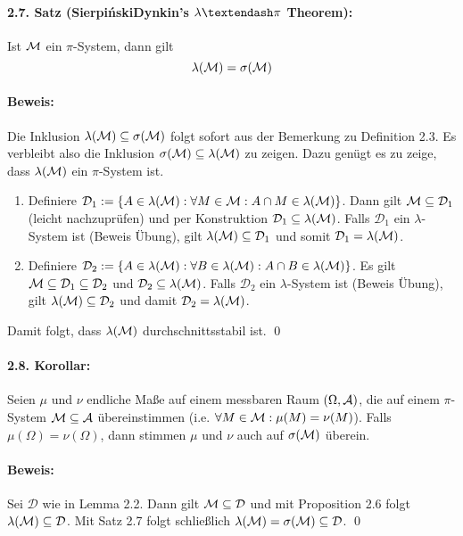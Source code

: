 \documentclass[12pt]{report}
\begin{document}
\paragraph{2.7. Satz (Sierpi\'{n}ski\textendash Dynkin's $\lambda\textendash\pi$ Theorem):}Ist $\mathcal{M}$ ein $\pi$-System, dann gilt 
$$\lambda(\mathcal{M})=\sigma(\mathcal{M})$$

\paragraph{Beweis:}Die Inklusion $\lambda(\mathcal{M})\subseteq\sigma(\mathcal{M})$ folgt sofort aus der Bemerkung zu Definition 2.3. Es verbleibt also die Inklusion $\sigma(\mathcal{M})\subseteq\lambda(\mathcal{M})$ zu zeigen. Dazu gen\"ugt es zu zeige, dass $\lambda(\mathcal{M})$ ein $\pi$-System ist. 
\begin{enumerate}[label=\Roman*.]
    \item Definiere $\mathcal{D}_1:=\left\{A\in\lambda(\mathcal{M}):\forall M\in\mathcal{M}:A\cap M\in\lambda(\mathcal{M})\right\}$. Dann gilt $\mathcal{M}\subseteq\mathcal{D}_1$ (leicht nachzupr\"ufen) und per Konstruktion $\mathcal{D}_1\subseteq\lambda(\mathcal{M})$. Falls $\mathcal{D}_1$ ein $\lambda$-System ist (Beweis \"Ubung), gilt $\lambda(\mathcal{M})\subseteq\mathcal{D}_1$ und somit $\mathcal{D}_1=\lambda(\mathcal{M})$.
    \item Definiere $\mathcal{D}_2:=\left\{A\in\lambda(\mathcal{M}):\forall B\in\lambda(\mathcal{M}):A\cap B\in\lambda(\mathcal{M})\right\}$. Es gilt $\mathcal{M}\subseteq\mathcal{D}_1\subseteq\mathcal{D}_2$ und $\mathcal{D}_2\subseteq\lambda(\mathcal{M})$. Falls $\mathcal{D}_2$ ein $\lambda$-System ist (Beweis \"Ubung), gilt $\lambda(\mathcal{M})\subseteq\mathcal{D}_2$ und damit $\mathcal{D}_2=\lambda(\mathcal{M})$. 
\end{enumerate}
Damit folgt, dass $\lambda(\mathcal{M})$ durchschnittsstabil ist. \qed

\paragraph{2.8. Korollar:}Seien $\mu$ und $\nu$ endliche Ma\ss{}e auf einem messbaren Raum $(\Omega,\mathcal{A})$, die auf einem $\pi$-System $\mathcal{M}\subseteq\mathcal{A}$ \"ubereinstimmen (i.e. $\forall M\in\mathcal{M}:\mu(M)=\nu(M)$). Falls $\mu(\Omega)=\nu(\Omega)$, dann stimmen $\mu$ und $\nu$ auch auf $\sigma(\mathcal{M})$ \"uberein. 

\paragraph{Beweis:}Sei $\mathcal{D}$ wie in Lemma 2.2. Dann gilt $\mathcal{M}\subseteq\mathcal{D}$ und mit Proposition 2.6 folgt $\lambda(\mathcal{M})\subseteq\mathcal{D}$. Mit Satz 2.7 folgt schlie\ss{}lich $\lambda(\mathcal{M})=\sigma(\mathcal{M})\subseteq\mathcal{D}$. \qed
\end{document}
